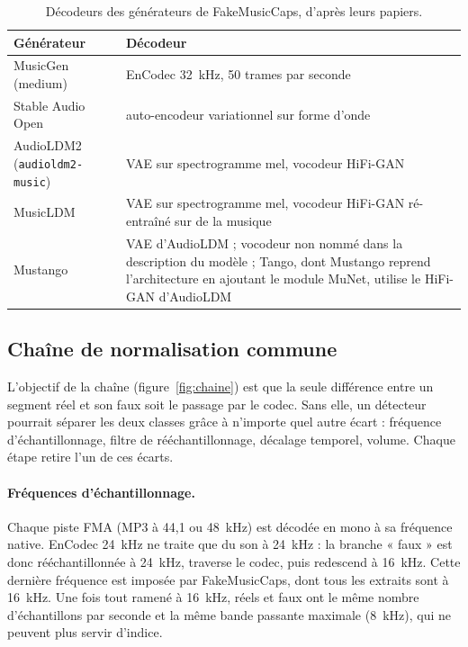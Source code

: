 \documentclass[a4paper, 11pt]{article}
\begin{document}
\begin{table}[h]
    \centering
    \small
    \begin{tabularx}{\textwidth}{lY}
        \toprule
        Générateur & Décodeur \\
        \midrule
        MusicGen (medium) & EnCodec 32~kHz, 50 trames par seconde \cite{copet2023musicgen} \\
        Stable Audio Open & auto-encodeur variationnel sur forme d'onde \cite{evans2024stableaudioopen} \\
        AudioLDM2 (\texttt{audioldm2-music}) & VAE sur spectrogramme mel, vocodeur HiFi-GAN \cite{liu2024audioldm2} \\
        MusicLDM & VAE sur spectrogramme mel, vocodeur HiFi-GAN ré-entraîné sur de la musique \cite{chen2023musicldm} \\
        Mustango & VAE d'AudioLDM \cite{melechovsky2024mustango} ; vocodeur non nommé dans la description du
        modèle ; Tango, dont Mustango reprend l'architecture en ajoutant le module MuNet, utilise le HiFi-GAN
        d'AudioLDM \cite{ghosal2023tango} \\
        \bottomrule
    \end{tabularx}
    \caption{Décodeurs des générateurs de FakeMusicCaps, d'après leurs papiers.}
    \label{tab:decodeurs}
\end{table}

\subsection{Chaîne de normalisation commune}

L'objectif de la chaîne (figure~\ref{fig:chaine}) est que la seule différence entre un segment réel et son faux
soit le passage par le codec. Sans elle, un détecteur pourrait séparer les deux classes grâce à n'importe quel
autre écart : fréquence d'échantillonnage, filtre de rééchantillonnage, décalage temporel, volume. Chaque étape
retire l'un de ces écarts.

\paragraph{Fréquences d'échantillonnage.} Chaque piste FMA (MP3 à 44,1 ou 48~kHz) est décodée en mono à sa
fréquence native. EnCodec 24~kHz \cite{defossez2022encodec} ne traite que du son à 24~kHz : la branche « faux »
est donc rééchantillonnée à 24~kHz, traverse le codec, puis redescend à 16~kHz. Cette dernière fréquence est
imposée par FakeMusicCaps, dont tous les extraits sont à 16~kHz. Une fois tout ramené à 16~kHz, réels et faux
ont le même nombre d'échantillons par seconde et la même bande passante maximale (8~kHz), qui ne peuvent plus
servir d'indice.
\end{document}
